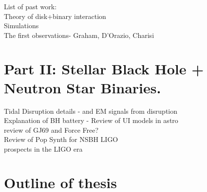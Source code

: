 List of past work:\\
Theory of disk+binary interaction\\
Simulations\\

The first observations- Graham, D'Orazio, Charisi



\section{Part II: Stellar Black Hole + Neutron Star Binaries.}

Tidal Disruption details - and EM signals from disruption\\

Explanation of BH battery - Review of UI models in astro\\

review of GJ69 and Force Free?\\

Review of Pop Synth for NSBH LIGO\\


prospects in the LIGO era









\section{Outline of thesis}
























